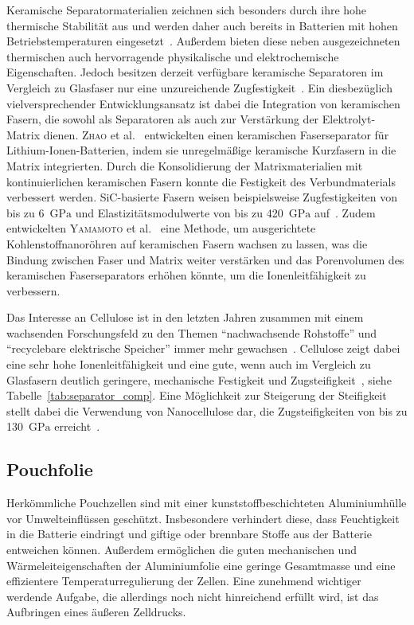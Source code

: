 Keramische Separatormaterialien zeichnen sich besonders durch ihre hohe thermische Stabilität aus und werden daher auch bereits in Batterien mit hohen Betriebstemperaturen eingesetzt~\cite{Qin2017,Cheong2012}. Außerdem bieten diese neben ausgezeichneten thermischen auch hervorragende physikalische und elektrochemische Eigenschaften. Jedoch besitzen derzeit verfügbare keramische Separatoren im Vergleich zu Glasfaser nur eine unzureichende Zugfestigkeit~\cite{Qin2017}. Ein diesbezüglich vielversprechender Entwicklungsansatz ist dabei die Integration von keramischen Fasern, die sowohl als Separatoren als auch zur Verstärkung der Elektrolyt-Matrix dienen. \textsc{Zhao} et al.~\cite{Zhao2017} entwickelten einen keramischen Faserseparator für Lithium-Ionen-Batterien, indem sie unregelmäßige keramische Kurzfasern in die Matrix integrierten. Durch die Konsolidierung der Matrixmaterialien mit kontinuierlichen keramischen Fasern konnte die Festigkeit des Verbundmaterials verbessert werden. SiC-basierte Fasern weisen beispielsweise Zugfestigkeiten von bis zu 6~$\si{\GPa}$ und Elastizitätsmodulwerte von bis zu 420~$\si{\GPa}$ auf~\cite{Seydibeyoglu2017}. Zudem entwickelten \textsc{Yamamoto} et al.~\cite{Yamamoto2009} eine Methode, um ausgerichtete Kohlenstoffnanoröhren auf keramischen Fasern wachsen zu lassen, was die Bindung zwischen Faser und Matrix weiter verstärken und das Porenvolumen des keramischen Faserseparators erhöhen könnte, um die Ionenleitfähigkeit zu verbessern.

Das Interesse an Cellulose ist in den letzten Jahren zusammen mit einem wachsenden Forschungsfeld zu den Themen "`nachwachsende Rohstoffe"' und "`recyclebare elektrische Speicher"' immer mehr gewachsen~\cite{Liang2018,Teng2020}. Cellulose zeigt dabei eine sehr hohe Ionenleitfähigkeit und eine gute, wenn auch im Vergleich zu Glasfasern deutlich geringere, mechanische Festigkeit und Zugsteifigkeit~\cite{Xu2020}, siehe Tabelle~\ref{tab:separator_comp}. Eine Möglichkeit zur Steigerung der Steifigkeit stellt dabei die Verwendung von Nanocellulose dar, die Zugsteifigkeiten von bis zu 130~$\si{\GPa}$ erreicht~\cite{Dufresne2013,Zhang2019}.

\subsection{Pouchfolie}
Herkömmliche Pouchzellen sind mit einer kunststoffbeschichteten Aluminiumhülle vor Umwelteinflüssen geschützt. Insbesondere verhindert diese, dass Feuchtigkeit in die Batterie eindringt und giftige oder brennbare Stoffe aus der Batterie entweichen können. Außerdem ermöglichen die guten mechanischen und Wärmeleiteigenschaften der Aluminiumfolie eine geringe Gesamtmasse und eine effizientere Temperaturregulierung der Zellen. Eine zunehmend wichtiger werdende Aufgabe, die allerdings noch nicht hinreichend erfüllt wird, ist das Aufbringen eines äußeren Zelldrucks.

